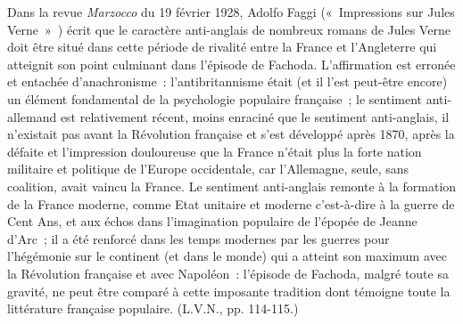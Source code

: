 \documentclass[french,twoside]{book} %
\begin{document}
Dans la revue \emph{Marzocco} du 19 février 1928, Adolfo Faggi (« Impressions sur Jules Verne » ) écrit que le caractère anti-anglais de nombreux romans de Jules Verne doit être situé dans cette période de rivalité entre la France et l’Angleterre qui atteignit son point culminant dans l’épisode de Fachoda. L'affirmation est erronée et entachée d’anachronisme : l’antibritannisme était (et il l’est peut-être encore) un élément fondamental de la psychologie populaire française ; le sentiment anti-allemand est relativement récent, moins enraciné que le sentiment anti-anglais, il n’existait pas avant la Révolution française et s’est développé après 1870, après la défaite et l’impression douloureuse que la France n’était plus la forte nation militaire et politique de l’Europe occidentale, car l’Allemagne, seule, sans coalition, avait vaincu la France. Le sentiment anti-anglais remonte à la formation de la France moderne, comme Etat unitaire et moderne c’est-à-dire à la guerre de Cent Ans, et aux échos dans l’imagination populaire de l’épopée de Jeanne d’Arc ; il a été renforcé dans les temps modernes par les guerres pour l’hégémonie sur le continent (et dans le monde) qui a atteint son maximum avec la Révolution française et avec Napoléon : l’épisode de Fachoda, malgré toute sa gravité, ne peut être comparé à cette imposante tradition dont témoigne toute la littérature française populaire. (L.V.N., pp. 114-115.)\par
{\raggedleft \noindent [1934-1935]\par}
\noindent  
\end{document}
